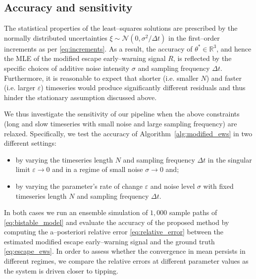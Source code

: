 \subsection{Accuracy and sensitivity}\label{subsec:sensitivity}
The statistical properties of the least--squares solutions are prescribed by the normally distributed uncertainties $\xi\sim\mathcal{N}(0,\sigma^2/\Delta t)$ in the first--order increments as per \eqref{eq:increments}.
As a result, the accuracy of $\theta^*\in \mathbb{R}^{3}$, and hence the MLE of the modified escape early--warning signal $R$, is reflected by the specific choices of additive noise intensity $\sigma$ and sampling frequency $\Delta t$.
Furthermore, it is reasonable to expect that shorter (i.e. smaller $N$) and faster (i.e. larger $\varepsilon$) timeseries would produce significantly different residuals and thus hinder the stationary assumption discussed above.

We thus investigate the sensitivity of our pipeline when the above constraints (long and slow timeseries with small noise and large sampling frequency) are relaxed.
Specifically, we test the accuracy of Algorithm~\ref{alg:modified_ews} in two different settings:
%
\begin{itemize}
     \item by varying the timeseries length $N$ and sampling frequency $\Delta t$ in the singular limit $\varepsilon\to0$ and in a regime of small noise $\sigma\to0$ and;
     \item by varying the parameter's rate of change $\varepsilon$ and noise level $\sigma$ with fixed timeseries length $N$ and sampling frequency $\Delta t$.
\end{itemize}
%
In both cases we run an ensemble simulation of $1{,}000$ sample paths of \eqref{eq:bistable_model} and evaluate the accuracy of the proposed method by computing the a--posteriori relative error \eqref{eq:relative_error} between the estimated modified escape early--warning signal and the ground truth \eqref{eq:escape_ews}.
In order to assess whether the convergence in mean persists in different regimes, we compare the relative errors at different parameter values as the system is driven closer to tipping.
 
